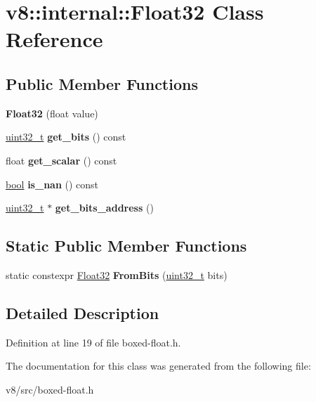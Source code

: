 \hypertarget{classv8_1_1internal_1_1Float32}{}\section{v8\+:\+:internal\+:\+:Float32 Class Reference}
\label{classv8_1_1internal_1_1Float32}
\subsection*{Public Member Functions}
\begin{DoxyCompactItemize}
\item 
\mbox{\label{classv8_1_1internal_1_1Float32_a704771314a47eaed9e0f1be3cf7cd57a}} 
{\bfseries Float32} (float value)
\item 
\mbox{\label{classv8_1_1internal_1_1Float32_af90ea9b161266cff2cb72766d5d62660}} 
\mbox{\hyperlink{classuint32__t}{uint32\+\_\+t}} {\bfseries get\+\_\+bits} () const
\item 
\mbox{\label{classv8_1_1internal_1_1Float32_a8629da6389b8e7c3bc690fd4fec783b1}} 
float {\bfseries get\+\_\+scalar} () const
\item 
\mbox{\label{classv8_1_1internal_1_1Float32_a30c1ca52aab1622f2df595b332714152}} 
\mbox{\hyperlink{classbool}{bool}} {\bfseries is\+\_\+nan} () const
\item 
\mbox{\label{classv8_1_1internal_1_1Float32_ab4a538848f8b486dc0d5d5e1d630b263}} 
\mbox{\hyperlink{classuint32__t}{uint32\+\_\+t}} $\ast$ {\bfseries get\+\_\+bits\+\_\+address} ()
\end{DoxyCompactItemize}
\subsection*{Static Public Member Functions}
\begin{DoxyCompactItemize}
\item 
\mbox{\label{classv8_1_1internal_1_1Float32_adc213b0019c2d1a710ec311045dd488f}} 
static constexpr \mbox{\hyperlink{classv8_1_1internal_1_1Float32}{Float32}} {\bfseries From\+Bits} (\mbox{\hyperlink{classuint32__t}{uint32\+\_\+t}} bits)
\end{DoxyCompactItemize}


\subsection{Detailed Description}


Definition at line 19 of file boxed-\/float.\+h.



The documentation for this class was generated from the following file\+:\begin{DoxyCompactItemize}
\item 
v8/src/boxed-\/float.\+h\end{DoxyCompactItemize}
